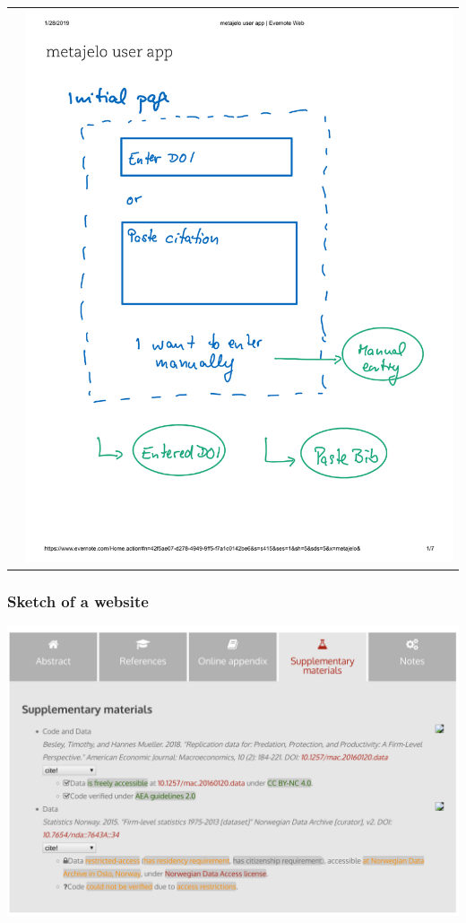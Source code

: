 \begin{frame}
\begin{tabular}{cc}
&
\includegraphics[page={7},height=0.7\paperheight]{images/metajelo-user-app-Evernote.pdf}
\end{tabular}
\end{frame}

\begin{frame}
\frametitle{Sketch of a website}
\includegraphics[height=0.7\paperheight]{images/aeaweb-demo1.png}
\end{frame}

